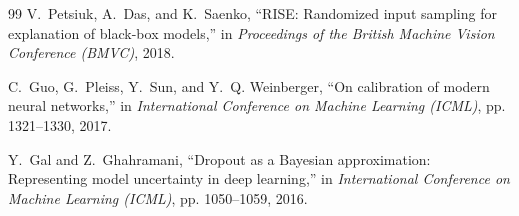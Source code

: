 \documentclass[12pt,a4paper]{report}
\begin{document}
\begin{thebibliography}{99}
	V.~Petsiuk, A.~Das, and K.~Saenko,
	``RISE: Randomized input sampling for explanation of black-box models,''
	in \emph{Proceedings of the British Machine Vision Conference (BMVC)}, 2018.
	
	C.~Guo, G.~Pleiss, Y.~Sun, and Y.~Q. Weinberger,
	``On calibration of modern neural networks,''
	in \emph{International Conference on Machine Learning (ICML)}, pp. 1321--1330, 2017.
	
	Y.~Gal and Z.~Ghahramani,
	``Dropout as a Bayesian approximation: Representing model uncertainty in deep learning,''
	in \emph{International Conference on Machine Learning (ICML)}, pp. 1050--1059, 2016.
	
\end{thebibliography}
	
\end{document}
